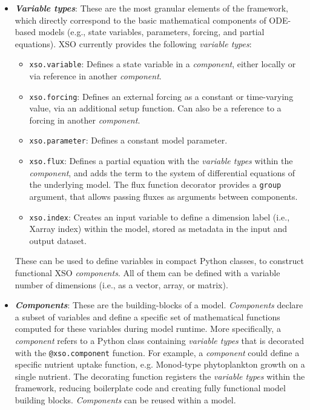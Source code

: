 \documentclass[gmd, manuscript]{copernicus}
\begin{document}
\begin{itemize}
    \item  \textbf{\textit{Variable types}}: These are the most granular elements of the framework, which directly correspond to the basic mathematical components of ODE-based models (e.g., state variables, parameters, forcing, and partial equations). XSO currently provides the following \textit{variable types}: 
    \begin{itemize}
        \item \texttt{xso.variable}: Defines a state variable in a \textit{component}, either locally or via reference in another \textit{component}.
        \item \texttt{xso.forcing}: Defines an external forcing as a constant or time-varying value, via an additional setup function. Can also be a reference to a forcing in another \textit{component}.
        \item \texttt{xso.parameter}: Defines a constant model parameter.
        \item \texttt{xso.flux}: Defines a partial equation with the \textit{variable types} within the \textit{component}, and adds the term to the system of differential equations of the underlying model. The flux function decorator provides a \texttt{group} argument, that allows passing fluxes as arguments between components.
        \item \texttt{xso.index}: Creates an input variable to define a dimension label (i.e., Xarray index) within the model, stored as metadata in the input and output dataset.
    \end{itemize}
    These can be used to define variables in compact Python classes, to construct functional XSO \textit{components}. All of them can be defined with a variable number of dimensions (i.e., as a vector, array, or matrix).

    \item \textbf{\textit{Components}}: These are the building-blocks of a model. \textit{Components} declare a subset of variables and define a specific set of mathematical functions computed for these variables during model runtime. More specifically, a \textit{component} refers to a Python class containing \textit{variable types} that is decorated with the \texttt{@xso.component} function. For example, a \textit{component} could define a specific nutrient uptake function, e.g. Monod-type phytoplankton growth on a single nutrient. The decorating function registers the \textit{variable types} within the framework, reducing boilerplate code and creating fully functional model building blocks. \textit{Components} can be reused within a model.


\end{itemize}
\end{document}
